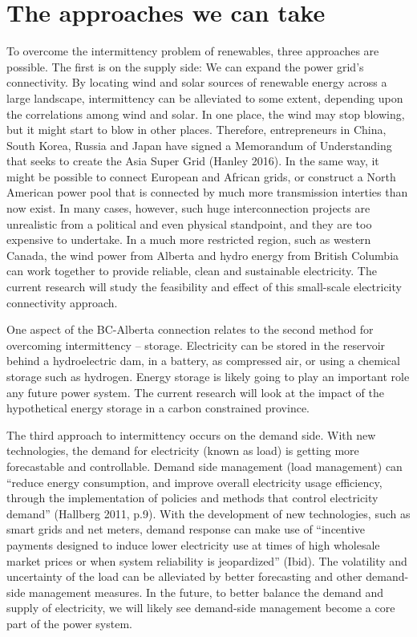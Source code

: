 \section{The approaches we can
	take}\label{the-approaches-we-can-take}

To overcome the intermittency problem of renewables, three approaches
are possible. The first is on the supply side: We can expand the power
grid's connectivity. By locating wind and solar sources of renewable
energy across a large landscape, intermittency can be alleviated to some
extent, depending upon the correlations among wind and solar. In one
place, the wind may stop blowing, but it might start to blow in other
places. Therefore, entrepreneurs in China, South Korea, Russia and Japan
have signed a Memorandum of Understanding that seeks to create the Asia
Super Grid (Hanley 2016). In the same way, it might be possible to
connect European and African grids, or construct a North American power
pool that is connected by much more transmission interties than now
exist. In many cases, however, such huge interconnection projects are
unrealistic from a political and even physical standpoint, and they are
too expensive to undertake. In a much more restricted region, such as
western Canada, the wind power from Alberta and hydro energy from
British Columbia can work together to provide reliable, clean and
sustainable electricity. The current research will study the feasibility
and effect of this small-scale electricity connectivity approach.

One aspect of the BC-Alberta connection relates to the second method for
overcoming intermittency -- storage. Electricity can be stored in the
reservoir behind a hydroelectric dam, in a battery, as compressed air,
or using a chemical storage such as hydrogen. Energy storage is likely
going to play an important role any future power system. The current
research will look at the impact of the hypothetical energy storage in a
carbon constrained province.

The third approach to intermittency occurs on the demand side. With new
technologies, the demand for electricity (known as load) is getting more
forecastable and controllable. Demand side management (load management)
can ``reduce energy consumption, and improve overall electricity usage
efficiency, through the implementation of policies and methods that
control electricity demand'' (Hallberg 2011, p.9). With the development
of new technologies, such as smart grids and net meters, demand response
can make use of ``incentive payments designed to induce lower
electricity use at times of high wholesale market prices or when system
reliability is jeopardized'' (Ibid). The volatility and uncertainty of
the load can be alleviated by better forecasting and other demand-side
management measures. In the future, to better balance the demand and
supply of electricity, we will likely see demand-side management become
a core part of the power system.

